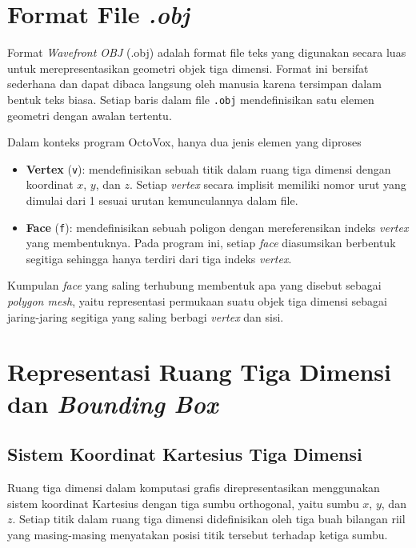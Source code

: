 \section{Format File \textit{.obj}}

Format \textit{Wavefront OBJ} (.obj) adalah format file teks yang digunakan
secara luas untuk merepresentasikan geometri objek tiga dimensi. Format ini
bersifat sederhana dan dapat dibaca langsung oleh manusia karena tersimpan dalam
bentuk teks biasa. Setiap baris dalam file \texttt{.obj} mendefinisikan satu
elemen geometri dengan awalan tertentu.

Dalam konteks program OctoVox, hanya dua jenis elemen yang diproses

\begin{itemize}
    \item \textbf{Vertex} (\texttt{v}): mendefinisikan sebuah titik dalam ruang
          tiga dimensi dengan koordinat $x$, $y$, dan $z$. Setiap \textit{vertex}
          secara implisit memiliki nomor urut yang dimulai dari 1 sesuai urutan
          kemunculannya dalam file.

    \item \textbf{Face} (\texttt{f}): mendefinisikan sebuah poligon dengan
          mereferensikan indeks \textit{vertex} yang membentuknya. Pada program ini,
          setiap \textit{face} diasumsikan berbentuk segitiga sehingga hanya terdiri
          dari tiga indeks \textit{vertex}.
\end{itemize}

Kumpulan \textit{face} yang saling terhubung membentuk apa yang disebut sebagai
\textit{polygon mesh}, yaitu representasi permukaan suatu objek tiga dimensi
sebagai jaring-jaring segitiga yang saling berbagi \textit{vertex} dan sisi.

\section{Representasi Ruang Tiga Dimensi dan \textit{Bounding Box}}

\subsection{Sistem Koordinat Kartesius Tiga Dimensi}

Ruang tiga dimensi dalam komputasi grafis direpresentasikan menggunakan sistem
koordinat Kartesius dengan tiga sumbu orthogonal, yaitu sumbu $x$, $y$, dan $z$.
Setiap titik dalam ruang tiga dimensi didefinisikan oleh tiga buah bilangan riil
yang masing-masing menyatakan posisi titik tersebut terhadap ketiga sumbu.

